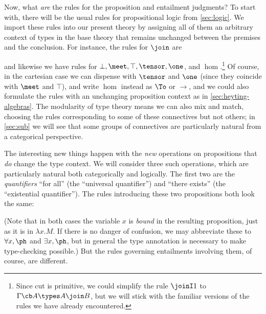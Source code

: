Now, what \emph{are} the rules for the proposition and entailment judgments?
To start with, there will be the usual rules for propositional logic from \cref{sec:logic}.
We import these rules into our present theory by assigning all of them an arbitrary context of types in the base theory that remains unchanged between the premises and the conclusion.
For instance, the rules for $\join$ are
and likewise we have rules for $\bot,\meet,\top,\tensor,\one$, and $\hom$.\footnote{Since cut is primitive, we could simplify the rule $\joinI1$ to $\Gamma\cb A\types A\join B$, but we will stick with the familiar versions of the rules we have already encountered.}
Of course, in the cartesian case we can dispense with $\tensor$ and $\one$ (since they coincide with $\meet$ and $\top$), and write $\hom$ instead as $\To$ or $\to$, and we could also formulate the rules with an unchanging proposition context as in \cref{sec:heyting-algebras}.
The modularity of type theory means we can also mix and match, choosing the rules corresponding to some of these connectives but not others; in \cref{sec:sub} we will see that some groups of connectives are particularly natural from a categorical perspective.

The interesting new things happen with the \emph{new} operations on propositions that \emph{do} change the type context.
We will consider three such operations, which are particularly natural both categorically and logically.
The first two are the \emph{quantifiers} ``for all'' (the ``universal quantifier'') and ``there exists'' (the ``existential quantifier'').
The rules introducing these two propositions both look the same:
(Note that in both cases the variable $x$ is \emph{bound} in the resulting proposition, just as it is in $\lambda x.M$.
If there is no danger of confusion, we may abbreviate these to $\forall x,\ph$ and $\exists x,\ph$, but in general the type annotation is necessary to make type-checking possible.)
But the rules governing entailments involving them, of course, are different.

